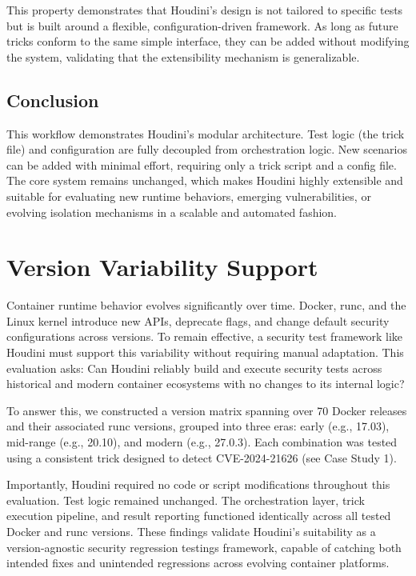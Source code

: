 \begin{doublespace}
This property demonstrates that Houdini’s design is not tailored to specific tests but is built around a flexible, configuration-driven framework. As long as future tricks conform to the same simple interface, they can be added without modifying the system, validating that the extensibility mechanism is generalizable.

\subsection*{Conclusion}

This workflow demonstrates Houdini’s modular architecture. Test logic (the trick file) and configuration are fully decoupled from orchestration logic. New scenarios can be added with minimal effort, requiring only a trick script and a config file. The core system remains unchanged, which makes Houdini highly extensible and suitable for evaluating new runtime behaviors, emerging vulnerabilities, or evolving isolation mechanisms in a scalable and automated fashion.


















\section{Version Variability Support}

Container runtime behavior evolves significantly over time. Docker, runc, and the Linux kernel introduce new APIs, deprecate flags, and change default security configurations across versions. To remain effective, a security test framework like Houdini must support this variability without requiring manual adaptation. This evaluation asks: Can Houdini reliably build and execute security tests across historical and modern container ecosystems with no changes to its internal logic?

To answer this, we constructed a version matrix spanning over 70 Docker releases and their associated runc versions, grouped into three eras: early (e.g., 17.03), mid-range (e.g., 20.10), and modern (e.g., 27.0.3). Each combination was tested using a consistent trick designed to detect CVE-2024-21626 (see Case Study 1).

Importantly, Houdini required no code or script modifications throughout this evaluation. Test logic remained unchanged. The orchestration layer, trick execution pipeline, and result reporting functioned identically across all tested Docker and runc versions. These findings validate Houdini’s suitability as a version-agnostic security \glspl{regression testing} framework, capable of catching both intended fixes and unintended regressions across evolving container platforms.


\end{doublespace}
